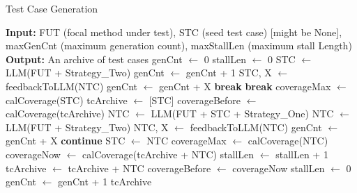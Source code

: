 \documentclass{article}
\begin{document}
\begin{algorithm}
    \caption{Test Case Generation}
    \begin{algorithmic}[1]
        \STATE \textbf{Input:} FUT (focal method under test), STC (seed test case) [might be None],
        maxGenCnt (maximum generation count), maxStallLen (maximum stall Length)
        \STATE \textbf{Output:} An archive of test cases
        \STATE genCnt $\gets$ 0
        \STATE stallLen $\gets$ 0
        \STATE STC $\gets$ LLM(FUT + Strategy\_Two)
        \STATE genCnt $\gets$ genCnt + 1
        \STATE STC, X $\gets$ feedbackToLLM(NTC)
        \STATE genCnt $\gets$ genCnt + X
        \ELSE
        \STATE \textbf{break}
        \ENDIF
        \STATE \textbf{break}
        \ENDIF
        \ENDWHILE
        \ENDIF
        \RETURN [] 
        \ENDIF
        coverageMax $\gets$ calCoverage(STC)
        tcArchive $\gets$ [STC]
        coverageBefore $\gets$ calCoverage(tcArchive)
        \STATE NTC $\gets$ LLM(FUT + STC + Strategy\_One)
        \ELSE
        \STATE NTC $\gets$ LLM(FUT + Strategy\_Two)
        \ENDIF
        \STATE NTC, X $\gets$ feedbackToLLM(NTC)
        \ENDIF
        \STATE genCnt $\gets$ genCnt + X
        \STATE \textbf{continue}
        \ENDIF
        \STATE STC $\gets$ NTC
        \STATE coverageMax $\gets$ calCoverage(NTC)
        \ENDIF
        coverageNow $\gets$ calCoverage(tcArchive + NTC)
        \STATE stallLen $\gets$ stallLen + 1
        \ELSE
        \STATE tcArchive $\gets$ tcArchive + NTC
        \STATE coverageBefore $\gets$ coverageNow
        \STATE stallLen $\gets$ 0
        \ENDIF
        \STATE genCnt $\gets$ genCnt + 1
        \ENDWHILE
        \RETURN tcArchive
    \end{algorithmic}
\end{algorithm}
\end{document}
